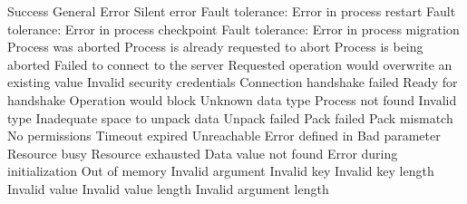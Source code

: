 \begin{constantdesc}
%
Success
%
General Error
%
Silent error
%
Fault tolerance: Error in process restart
%
Fault tolerance: Error in process checkpoint
%
Fault tolerance: Error in process migration
%
Process was aborted
%
Process is already requested to abort
%
Process is being aborted
%
Failed to connect to the server
%
Requested operation would overwrite an existing value
%
Invalid security credentials
%
Connection handshake failed
%
Ready for handshake
%
Operation would block
%
Unknown data type
%
Process not found
%
Invalid type
%
Inadequate space to unpack data
%
Unpack failed
%
Pack failed
%
Pack mismatch
%
No permissions
%
Timeout expired
%
Unreachable
%
Error defined in 
%
Bad parameter
%
Resource busy
%
Resource exhausted
%
Data value not found
%
Error during initialization
%
Out of memory
%
Invalid argument
%
Invalid key
%
Invalid key length
%
Invalid value
%
Invalid value length
%
Invalid argument length
%

\end{constantdesc}
